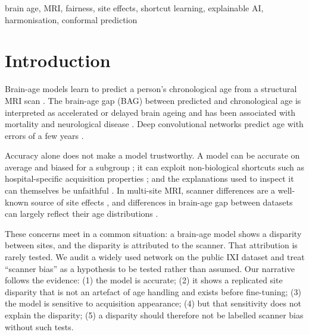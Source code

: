 \documentclass[conference]{IEEEtran}
\begin{document}
\begin{IEEEkeywords}
brain age, MRI, fairness, site effects, shortcut learning, explainable AI, harmonisation, conformal prediction
\end{IEEEkeywords}

\section{Introduction}
Brain-age models learn to predict a person's chronological age from a structural MRI scan \cite{cole2017trends,franke2019ten}. The brain-age gap (BAG) between predicted and chronological age is interpreted as accelerated or delayed brain ageing and has been associated with mortality and neurological disease \cite{cole2018mortality}. Deep convolutional networks predict age with errors of a few years \cite{cole2017deep,peng2021sfcn,bashyam2020dbn,leonardsen2022pyment}.

Accuracy alone does not make a model trustworthy. A model can be accurate on average and biased for a subgroup \cite{larrazabal2020gender,seyyed2021underdiagnosis,riccilara2022fairness,picarra2023brainage}; it can exploit non-biological shortcuts such as hospital-specific acquisition properties \cite{geirhos2020shortcut,zech2018pneumonia,degrave2021covid}; and the explanations used to inspect it can themselves be unfaithful \cite{adebayo2018sanity,hooker2019benchmark}. In multi-site MRI, scanner differences are a well-known source of site effects \cite{glocker2019scanner,fortin2018harmonization,dinsdale2021unlearning}, and differences in brain-age gap between datasets can largely reflect their age distributions \cite{aguzin2026bias}.

These concerns meet in a common situation: a brain-age model shows a disparity between sites, and the disparity is attributed to the scanner. That attribution is rarely tested. We audit a widely used network on the public IXI dataset and treat ``scanner bias'' as a hypothesis to be tested rather than assumed. Our narrative follows the evidence: (1) the model is accurate; (2) it shows a replicated site disparity that is not an artefact of age handling and exists before fine-tuning; (3) the model is sensitive to acquisition appearance; (4) but that sensitivity does not explain the disparity; (5) a disparity should therefore not be labelled scanner bias without such tests.
\end{document}
